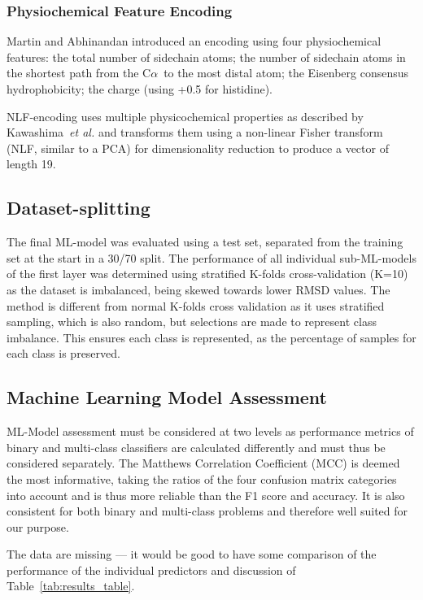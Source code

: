 \documentclass[12pt]{article}
\newcommand{\ca}{\mbox{C$\alpha$}}
\newcommand{\etal}{~\emph{et al.}}
\newcommand{\lilian}[1]{ {\color{red}{\bfseries Lilian:} #1}}
\let\shortcite\cite
\begin{document}
\subsubsection{Physiochemical Feature Encoding}
Martin and Abhinandan\shortcite{Abhinandan2010} introduced an encoding using
four physiochemical features:
the total number of sidechain atoms; the
number of sidechain atoms in the shortest path from the \ca\ to the most
distal atom; the Eisenberg consensus
hydrophobicity\cite{Eisenberg1982}; the charge (using +0.5 for histidine).

NLF-encoding \shortcite{Nanni2011} uses multiple physicochemical
properties as described by Kawashima\etal\shortcite{Kawashima2000} and
transforms them using a non-linear Fisher transform (NLF, similar to a
PCA) for dimensionality reduction to produce a vector of length 19.


\subsection{Dataset-splitting}
The final ML-model was evaluated using a test set, separated from the
training set at the start in a 30/70 split. The performance of all individual sub-ML-models of the first layer was determined using stratified K-folds cross-validation (K=10) as the
dataset is imbalanced, being skewed towards lower RMSD values\cite{Krstajic2014,Kohavi1995}. The
method is different from normal K-folds cross validation as it uses
stratified sampling, which is also random, but selections are made to represent class imbalance.
This ensures each class is represented, as the percentage of samples for each class is
preserved.

\subsection{Machine Learning Model Assessment} 
ML-Model assessment must be considered at two levels as performance
metrics of binary and multi-class classifiers are calculated
differently and must thus be considered separately. The Matthews
Correlation Coefficient (MCC)\cite{Chicco2020} is deemed the most
informative, taking the ratios of the four confusion matrix categories
into account and is thus more reliable than the F1 score and
accuracy. It is also consistent for both binary and multi-class
problems and therefore well suited for our purpose.\cite{Jurman2012}

\lilian{The data are missing --- it would be good to have some
  comparison of the performance of the individual predictors and
  discussion of Table~\ref{tab:results_table}.}
\end{document}
